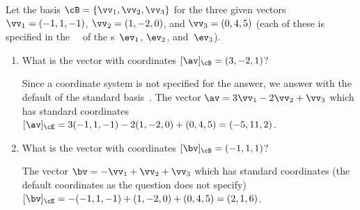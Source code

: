 \begin{example} 
Let the basis \(\cB=\{\vv_1,\vv_2,\vv_3\}\) for the three given vectors \(\vv_1=(-1,1,-1)\), \(\vv_2=(1,-2,0)\), and \(\vv_3=(0,4,5)\) (each of these is specified in the ~\cE\ of the s~\(\ev_1\), \(\ev_2\), and~\(\ev_3\)).
\begin{enumerate}
\item What is the vector with coordinates \([\av]_\cB=(3,-2,1)\)?
\begin{solution} 
Since a coordinate system is not specified for the answer, we answer with the default of the standard basis~\cE.
The vector \(\av=3\vv_1-2\vv_2+\vv_3\) which has standard coordinates 
\([\av]_\cE=3(-1,1,-1)-2(1,-2,0)+(0,4,5)=(-5,11,2)\).
\end{solution}

\item What is the vector with coordinates \([\bv]_\cB=(-1,1,1)\)?
\begin{solution} 
The vector \(\bv=-\vv_1+\vv_2+\vv_3\) which has standard coordinates (the default coordinates as the question does not specify) 
\([\bv]_\cE=-(-1,1,-1)+(1,-2,0)+(0,4,5)=(2,1,6)\).
\end{solution}


\end{enumerate}
\end{example}
